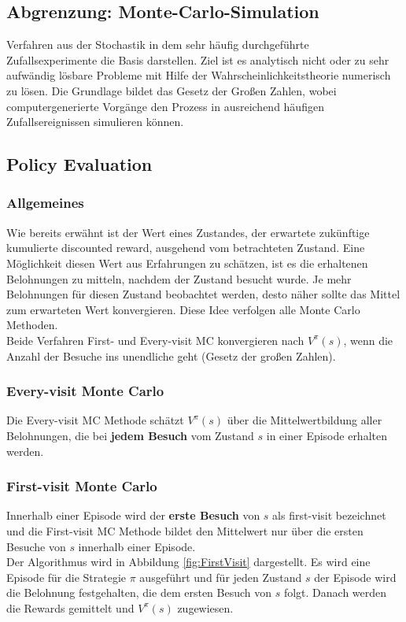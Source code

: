 \documentclass[10pt]{scrartcl}
\begin{document}
\subsection{Abgrenzung: Monte-Carlo-Simulation}
Verfahren aus der Stochastik in dem sehr häufig durchgeführte Zufallsexperimente die Basis darstellen. Ziel ist es analytisch nicht oder zu sehr aufwändig lösbare Probleme mit Hilfe der Wahrscheinlichkeitstheorie numerisch zu lösen. Die Grundlage bildet das Gesetz der Großen Zahlen, wobei computergenerierte Vorgänge den Prozess in ausreichend häufigen Zufallsereignissen simulieren können.

\subsection{Policy Evaluation}
\subsubsection{Allgemeines}
Wie bereits erwähnt ist der Wert eines Zustandes, der erwartete zukünftige kumulierte discounted reward, ausgehend vom betrachteten Zustand. Eine Möglichkeit diesen Wert aus Erfahrungen zu schätzen, ist es die erhaltenen Belohnungen zu mitteln, nachdem der Zustand besucht wurde. Je mehr Belohnungen für diesen Zustand beobachtet werden, desto näher sollte das Mittel zum erwarteten Wert konvergieren. Diese Idee verfolgen alle Monte Carlo Methoden.\\
Beide Verfahren First- und Every-visit MC konvergieren nach $V^{\pi}(s)$, wenn die Anzahl der Besuche ins unendliche geht (Gesetz der großen Zahlen).

\subsubsection{Every-visit Monte Carlo}
Die Every-visit MC Methode schätzt $V^{\pi}(s)$ über die Mittelwertbildung aller Belohnungen, die bei \textbf{jedem Besuch} vom Zustand $s$ in einer Episode erhalten werden.

\subsubsection{First-visit Monte Carlo}
Innerhalb einer Episode wird der \textbf{erste Besuch} von $s$ als first-visit bezeichnet und die First-visit MC Methode bildet den Mittelwert nur über die ersten Besuche von $s$ innerhalb einer Episode.\\
Der Algorithmus wird in Abbildung \ref{fig:FirstVisit} dargestellt. Es wird eine Episode für die Strategie $\pi$ ausgeführt und für jeden Zustand $s$ der Episode wird die Belohnung festgehalten, die dem ersten Besuch von $s$ folgt. Danach werden die Rewards gemittelt und $V^{\pi}(s)$ zugewiesen.
\end{document}

